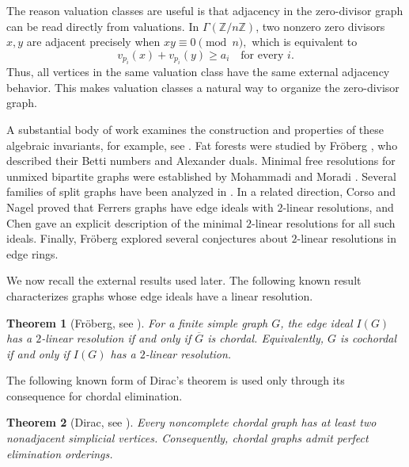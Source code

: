 \documentclass[12pt]{article}
\newtheorem{theorem}{Theorem}[section]
\theoremstyle{definition}
\begin{document}
The reason valuation classes are useful is that adjacency in the zero-divisor graph can be read directly from valuations. In $\Gamma(\mathbb{Z}/n\mathbb{Z})$, two nonzero zero divisors $x,y$ are adjacent precisely when
$ xy\equiv 0 \pmod n, $ which is equivalent to
$$
v_{p_i}(x)+v_{p_i}(y)\geq a_i
\quad\text{for every }i.
$$
Thus, all vertices in the same valuation class have the same external adjacency behavior. This makes valuation classes a natural way to organize the zero-divisor graph.


\medskip

A substantial body of work examines the construction and properties of these algebraic invariants, for example, see \cite{FernandezRamosGimenez2014, Froberg1990, Jacques2004, Villarreal2015}.  
Fat forests were studied by Fröberg \cite{Froberg2022}, who described their Betti numbers and Alexander duals.  
Minimal free resolutions for unmixed bipartite graphs were established by Mohammadi and Moradi \cite{MohammadiMoradi2015}.  
Several families of split graphs have been analyzed in \cite{SinghVerma2020}.
In a related direction, Corso and Nagel \cite{CorsoNagel2008,CorsoNagel2009} proved that Ferrers graphs have edge ideals with $2$-linear resolutions, and Chen \cite{Chen2010} gave an explicit description of the minimal $2$-linear resolutions for all such ideals.  
Finally, Fröberg \cite{Froberg2023} explored several conjectures about $2$-linear resolutions in edge rings.

\medskip

We now recall the external results used later.  The following known result characterizes graphs whose edge ideals have a linear resolution.
\begin{theorem}[Fröberg, see \cite{Froberg1990}]\label{thm:froberg}
For a finite simple graph $G$, the edge ideal $I(G)$ has a $2$-linear resolution if and only if $\overline{G}$ is chordal.  Equivalently, $G$ is cochordal if and only if $I(G)$ has a $2$-linear resolution.
\end{theorem}

\medskip

The following known form of Dirac's theorem is used only through its consequence for chordal elimination.
\begin{theorem}[Dirac, see \cite{Dirac1961,HerzogHibiZheng2004}]\label{thm:dirac}
Every noncomplete chordal graph has at least two nonadjacent simplicial vertices.  Consequently, chordal graphs admit perfect elimination orderings.
\end{theorem}
\end{document}

